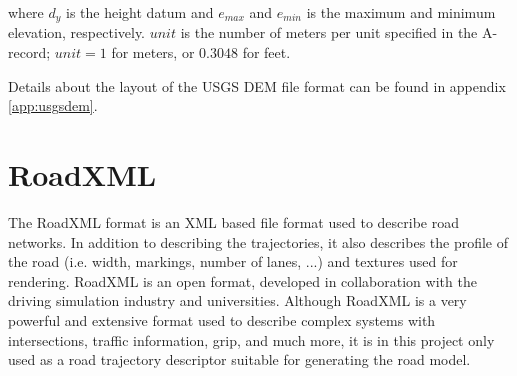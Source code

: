 where $d_y$ is the height datum and $e_{max}$ and $e_{min}$ is the maximum and minimum elevation, respectively. $unit$ is the number of meters per unit specified in the A-record; $unit=1$ for meters, or $0.3048$ for feet.

Details about the layout of the USGS DEM file format can be found in appendix \ref{app:usgsdem}.

\section{RoadXML}
The RoadXML format is an XML based file format used to describe road networks. In addition to describing the trajectories, it also describes the profile of the road (i.e. width, markings, number of lanes, ...) and textures used for rendering.\cite{roadxml} RoadXML is an open format, developed in collaboration with the driving simulation industry and universities. Although RoadXML is a very powerful and extensive format used to describe complex systems with intersections, traffic information, grip, and much more, it is in this project only used as a road trajectory descriptor suitable for generating the road model.


